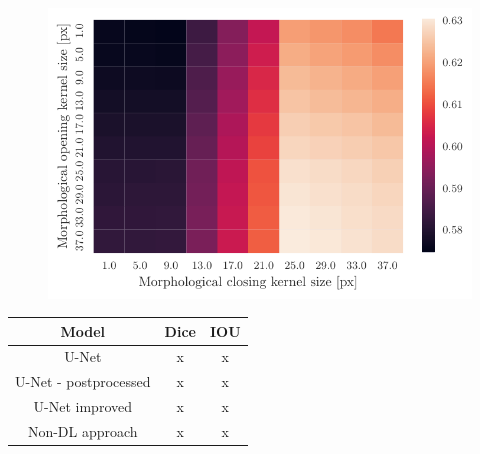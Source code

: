\begin{figure}
    \centering
    \includegraphics[]{images/heatmap_of_unetpostproc_search.pdf}
\end{figure}

\begin{table}
    \centering
    \begin{tabular}{|c|c|c|}
        \hline
        Model                 & Dice & IOU \\ \hline
        U-Net                 & x    & x   \\ \hline
        U-Net - postprocessed & x    & x   \\ \hline
        U-Net improved        & x    & x   \\ \hline
        Non-DL approach       & x    & x   \\ \hline
    \end{tabular}
\end{table}
